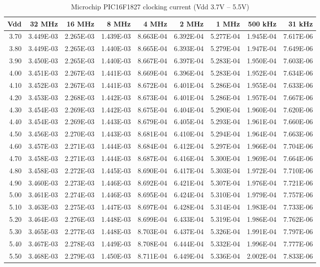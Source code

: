 \begin{table}
\begin{centering}
\begin{tabular}{|r|r|r|r|r|r|r|r|r|}
\hline
Vdd  & 32 MHz  & 16 MHz  & 8 MHz  & 4 MHz  & 2 MHz  & 1 MHz  & 500 kHz  & 31 kHz \tabularnewline
\hline
3.70  & 3.449E-03  & 2.265E-03  & 1.439E-03  & 8.663E-04  & 6.392E-04  & 5.277E-04  & 1.945E-04  & 7.617E-06 \tabularnewline
3.80  & 3.449E-03  & 2.265E-03  & 1.440E-03  & 8.665E-04  & 6.393E-04  & 5.279E-04  & 1.947E-04  & 7.649E-06 \tabularnewline
3.90  & 3.450E-03  & 2.265E-03  & 1.440E-03  & 8.667E-04  & 6.397E-04  & 5.283E-04  & 1.950E-04  & 7.603E-06 \tabularnewline
4.00  & 3.451E-03  & 2.267E-03  & 1.441E-03  & 8.669E-04  & 6.396E-04  & 5.283E-04  & 1.952E-04  & 7.634E-06 \tabularnewline
4.10  & 3.452E-03  & 2.267E-03  & 1.441E-03  & 8.672E-04  & 6.401E-04  & 5.286E-04  & 1.955E-04  & 7.633E-06 \tabularnewline
4.20  & 3.453E-03  & 2.268E-03  & 1.442E-03  & 8.673E-04  & 6.401E-04  & 5.286E-04  & 1.957E-04  & 7.667E-06 \tabularnewline
4.30  & 3.454E-03  & 2.269E-03  & 1.442E-03  & 8.675E-04  & 6.404E-04  & 5.290E-04  & 1.960E-04  & 7.620E-06 \tabularnewline
4.40  & 3.454E-03  & 2.269E-03  & 1.443E-03  & 8.679E-04  & 6.405E-04  & 5.293E-04  & 1.961E-04  & 7.660E-06 \tabularnewline
4.50  & 3.456E-03  & 2.270E-03  & 1.443E-03  & 8.681E-04  & 6.410E-04  & 5.294E-04  & 1.964E-04  & 7.663E-06 \tabularnewline
4.60  & 3.457E-03  & 2.271E-03  & 1.444E-03  & 8.684E-04  & 6.412E-04  & 5.297E-04  & 1.966E-04  & 7.704E-06 \tabularnewline
4.70  & 3.458E-03  & 2.271E-03  & 1.444E-03  & 8.687E-04  & 6.416E-04  & 5.300E-04  & 1.969E-04  & 7.664E-06 \tabularnewline
4.80  & 3.458E-03  & 2.272E-03  & 1.445E-03  & 8.690E-04  & 6.417E-04  & 5.303E-04  & 1.972E-04  & 7.710E-06 \tabularnewline
4.90  & 3.460E-03  & 2.273E-03  & 1.446E-03  & 8.692E-04  & 6.421E-04  & 5.307E-04  & 1.976E-04  & 7.721E-06 \tabularnewline
5.00  & 3.461E-03  & 2.274E-03  & 1.446E-03  & 8.695E-04  & 6.424E-04  & 5.310E-04  & 1.979E-04  & 7.757E-06 \tabularnewline
5.10  & 3.463E-03  & 2.275E-03  & 1.447E-03  & 8.697E-04  & 6.428E-04  & 5.314E-04  & 1.983E-04  & 7.733E-06 \tabularnewline
5.20  & 3.464E-03  & 2.276E-03  & 1.448E-03  & 8.699E-04  & 6.433E-04  & 5.319E-04  & 1.986E-04  & 7.762E-06 \tabularnewline
5.30  & 3.465E-03  & 2.277E-03  & 1.448E-03  & 8.703E-04  & 6.437E-04  & 5.326E-04  & 1.991E-04  & 7.797E-06 \tabularnewline
5.40  & 3.467E-03  & 2.278E-03  & 1.449E-03  & 8.708E-04  & 6.444E-04  & 5.332E-04  & 1.996E-04  & 7.777E-06 \tabularnewline
5.50  & 3.468E-03  & 2.279E-03  & 1.450E-03  & 8.711E-04  & 6.449E-04  & 5.336E-04  & 2.002E-04  & 7.833E-06 \tabularnewline
\hline
\end{tabular}
\par\end{centering}

\protect\caption{Microchip PIC16F1827 clocking current (Vdd 3.7V -- 5.5V)}
\end{table}
